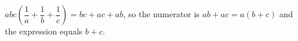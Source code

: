 $abc\left(\dfrac1a+\dfrac1b+\dfrac1c\right)=bc+ac+ab$, so the numerator is $ab+ac=a(b+c)$ and the expression equals $\boxed{b+c}$.
